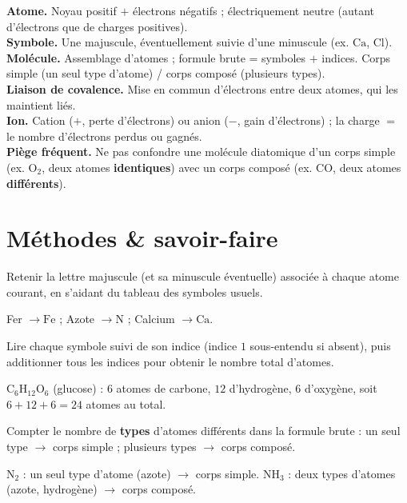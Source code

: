 \begin{synthese}
\textbf{Atome.} Noyau positif $+$ électrons négatifs ; électriquement neutre (autant
d'électrons que de charges positives).\\[4pt]
\textbf{Symbole.} Une majuscule, éventuellement suivie d'une minuscule (ex. $\mathrm{Ca}$,
$\mathrm{Cl}$).\\[4pt]
\textbf{Molécule.} Assemblage d'atomes ; formule brute = symboles $+$ indices. Corps simple
(un seul type d'atome) / corps composé (plusieurs types).\\[4pt]
\textbf{Liaison de covalence.} Mise en commun d'électrons entre deux atomes, qui les
maintient liés.\\[4pt]
\textbf{Ion.} Cation ($+$, perte d'électrons) ou anion ($-$, gain d'électrons) ; la charge
$=$ le nombre d'électrons perdus ou gagnés.\\[4pt]
\textbf{Piège fréquent.} Ne pas confondre une molécule diatomique d'un corps simple (ex.
$\mathrm{O_2}$, deux atomes \textbf{identiques}) avec un corps composé (ex. $\mathrm{CO}$,
deux atomes \textbf{différents}).
\end{synthese}

\section{Méthodes \& savoir-faire}

Retenir la lettre majuscule (et sa minuscule éventuelle) associée à chaque atome courant,
en s'aidant du tableau des symboles usuels.
\begin{exemple}
Fer $\to\mathrm{Fe}$ ; Azote $\to\mathrm{N}$ ; Calcium $\to\mathrm{Ca}$.
\end{exemple}

Lire chaque symbole suivi de son indice (indice $1$ sous-entendu si absent), puis
additionner tous les indices pour obtenir le nombre total d'atomes.
\begin{exemple}
$\mathrm{C_6H_{12}O_6}$ (glucose) : $6$ atomes de carbone, $12$ d'hydrogène, $6$ d'oxygène,
soit $6+12+6=24$ atomes au total.
\end{exemple}

Compter le nombre de \textbf{types} d'atomes différents dans la formule brute : un seul
type $\to$ corps simple ; plusieurs types $\to$ corps composé.
\begin{exemple}
$\mathrm{N_2}$ : un seul type d'atome (azote) $\to$ corps simple. $\mathrm{NH_3}$ : deux
types d'atomes (azote, hydrogène) $\to$ corps composé.
\end{exemple}

